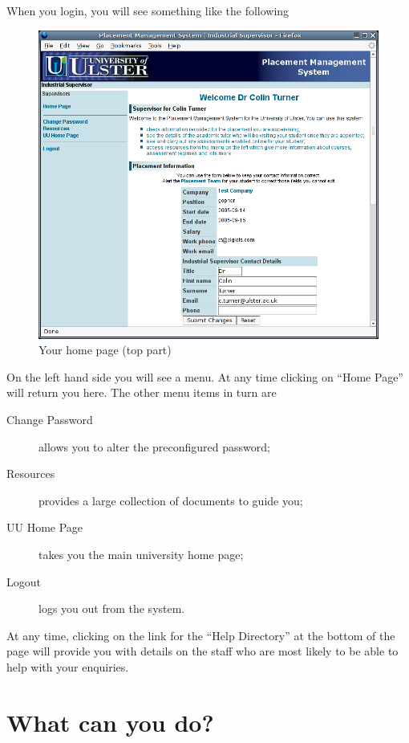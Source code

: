 \documentclass{article}
\begin{document}
When you login, you will see something like the following
\begin{figure}[htb]
\begin{center}
\includegraphics[scale=0.25]{png/supervisor_guide1.png}
\end{center}
\caption{Your home page (top part)}
\end{figure}
On the left hand side you will see a menu. 
At any time clicking on ``Home Page'' will return you here. The other menu
items in turn are

\begin{description}
\item[Change Password] allows you to alter the preconfigured password;
\item[Resources] provides a large collection of documents to guide you;
\item[UU Home Page] takes you the main university home page;
\item[Logout] logs you out from the system.
\end{description}

At any time, clicking on the link for the ``Help Directory'' at the bottom of the page
will provide you with details on the staff who are most likely to be
able to help with your enquiries.

\section{What can you do?}
\end{document}
